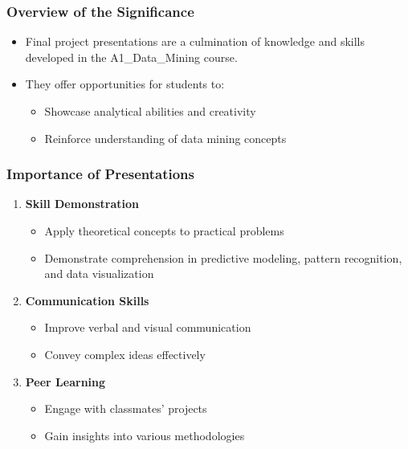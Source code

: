 \documentclass[aspectratio=169]{beamer}
\begin{document}
\frame{\titlepage}

\begin{frame}[fragile]
  \titlepage
\end{frame}

\begin{frame}[fragile]
  \frametitle{Overview of the Significance}
  \begin{itemize}
    \item Final project presentations are a culmination of knowledge and skills developed in the A1\_Data\_Mining course.
    \item They offer opportunities for students to:
    \begin{itemize}
      \item Showcase analytical abilities and creativity
      \item Reinforce understanding of data mining concepts
    \end{itemize}
  \end{itemize}
\end{frame}

\begin{frame}[fragile]
  \frametitle{Importance of Presentations}
  \begin{enumerate}
    \item \textbf{Skill Demonstration}
      \begin{itemize}
        \item Apply theoretical concepts to practical problems
        \item Demonstrate comprehension in predictive modeling, pattern recognition, and data visualization
      \end{itemize}
    \item \textbf{Communication Skills}
      \begin{itemize}
        \item Improve verbal and visual communication
        \item Convey complex ideas effectively
      \end{itemize}
    \item \textbf{Peer Learning}
      \begin{itemize}
        \item Engage with classmates’ projects
        \item Gain insights into various methodologies
      \end{itemize}
  \end{enumerate}
\end{frame}
\end{document}
